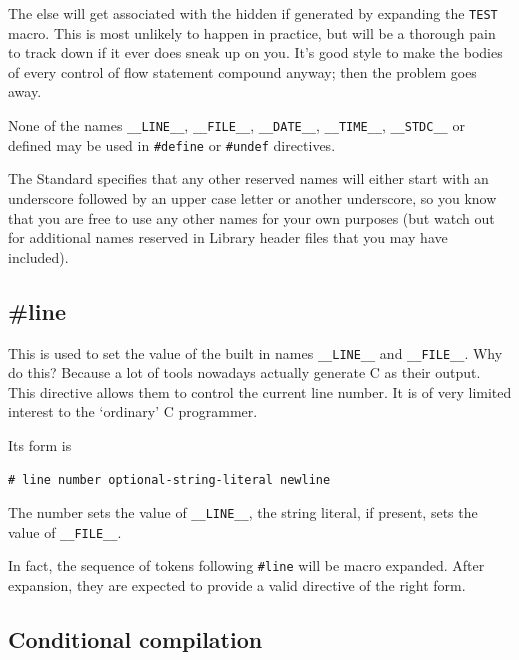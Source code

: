    The else will get associated with the hidden if generated by expanding
    the \texttt{TEST} macro. This is most unlikely to happen in
    practice, but will be a thorough pain to track down if it ever does
    sneak up on you. It's good style to make the bodies of every control of
    flow statement compound anyway; then the problem goes away.


   None of the names \texttt{\_\_LINE\_\_}, \texttt{\_\_FILE\_\_},
    \texttt{\_\_DATE\_\_}, \texttt{\_\_TIME\_\_}, \texttt{\_\_STDC\_\_} or
    defined may be used in \texttt{\#define} or \texttt{\#undef}
    directives.


   The Standard specifies that any other reserved names will either start
    with an underscore followed by an upper case letter or another
    underscore, so you know that you are free to use any other names for
    your own purposes (but watch out for additional names reserved in
    Library header files that you may have included).


  

  \subsection{\#line}
   

   This is used to set the value of the built in names
    \texttt{\_\_LINE\_\_} and \texttt{\_\_FILE\_\_}. Why do this? Because
    a lot of tools nowadays actually generate C as their output. This
    directive allows them to control the current line number. It is of very
    limited interest to the `ordinary' C programmer.


   Its form is


   \begin{Verbatim}
# line number optional-string-literal newline
\end{Verbatim}

   The number sets the value of \texttt{\_\_LINE\_\_}, the string
    literal, if present, sets the value of \texttt{\_\_FILE\_\_}.


   In fact, the sequence of tokens following \texttt{\#line} will be
    macro expanded. After expansion, they are expected to provide a valid
    directive of the right form.


  

  \subsection{Conditional compilation}
   

